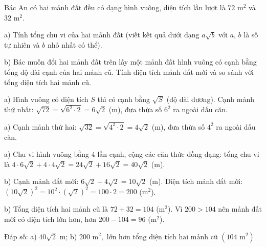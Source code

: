 \begin{problem}[9DS-CAN-023]
Bác An có hai mảnh đất đều có dạng hình vuông, diện tích lần lượt là $72 \text{ m}^2$ và $32 \text{ m}^2$.

a) Tính tổng chu vi của hai mảnh đất (viết kết quả dưới dạng $a\sqrt{b}$ với $a$, $b$ là số tự nhiên và $b$ nhỏ nhất có thể).

b) Bác muốn đổi hai mảnh đất trên lấy một mảnh đất hình vuông có cạnh bằng tổng độ dài cạnh của hai mảnh cũ. Tính diện tích mảnh đất mới và so sánh với tổng diện tích hai mảnh cũ.

\begin{solution}
a) Hình vuông có diện tích $S$ thì có cạnh bằng $\sqrt{S}$ (độ dài dương). Cạnh mảnh thứ nhất: $\sqrt{72} = \sqrt{6^2 \cdot 2} = 6\sqrt{2}$ (m), đưa thừa số $6^2$ ra ngoài dấu căn.

a) Cạnh mảnh thứ hai: $\sqrt{32} = \sqrt{4^2 \cdot 2} = 4\sqrt{2}$ (m), đưa thừa số $4^2$ ra ngoài dấu căn.

a) Chu vi hình vuông bằng $4$ lần cạnh, cộng các căn thức đồng dạng: tổng chu vi là $4 \cdot 6\sqrt{2} + 4 \cdot 4\sqrt{2} = 24\sqrt{2} + 16\sqrt{2} = 40\sqrt{2}$ (m).

b) Cạnh mảnh đất mới: $6\sqrt{2} + 4\sqrt{2} = 10\sqrt{2}$ (m). Diện tích mảnh đất mới: $(10\sqrt{2})^2 = 10^2 \cdot (\sqrt{2})^2 = 100 \cdot 2 = 200$ ($\text{m}^2$).

b) Tổng diện tích hai mảnh cũ là $72 + 32 = 104$ ($\text{m}^2$). Vì $200 > 104$ nên mảnh đất mới có diện tích lớn hơn, hơn $200 - 104 = 96$ ($\text{m}^2$).

Đáp số: a) $\boxed{40\sqrt{2} \text{ m}}$; b) $\boxed{200 \text{ m}^2, \text{ lớn hơn tổng diện tích hai mảnh cũ } (104 \text{ m}^2)}$
\end{solution}
\end{problem}

